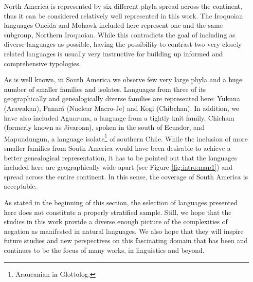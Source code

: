 \documentclass[output=paper,colorlinks,citecolor=brown]{langscibook}
\begin{document}
North America is represented by six different phyla spread across the continent, thus it can be considered relatively well represented in this work. The Iroquoian languages Oneida and Mohawk included here represent one and the same subgroup, Northern Iroquoian. While this contradicts the goal of including as diverse languages as possible, having the possibility to contrast two very closely related languages is usually very instructive for building up informed and comprehensive typologies. 

As is well known, in South America we observe few very large phyla and a huge number of smaller families and isolates. Languages from three of its geographically and genealogically diverse families are represented here: Yukuna (Arawakan), Panará (Nuclear Macro-Je) and Kogi (Chibchan). In addition, we have also included Aguaruna, a language from a tightly knit family, Chicham (formerly known as Jivaroan), spoken in the south of Ecuador, and Mapundungun, a language isolate\footnote{Araucanian in Glottolog.} of southern Chile. While the inclusion of more smaller families from South America would have been desirable to achieve a better genealogical representation, it has to be pointed out that the languages included here are geographically wide apart (see Figure \ref{fig:intro:map1}) and spread across the entire continent. In this sense, the coverage of South America is acceptable.


As stated in the beginning of this section, the selection of languages presented here does not constitute a properly stratified sample. Still, we hope that the studies in this work provide a diverse enough picture of the complexities of negation as manifested in natural languages. We also hope that they will inspire future studies and new perspectives on this fascinating domain that has been and continues to be the focus of many works, in linguistics and beyond. 

 
    
\end{document}
